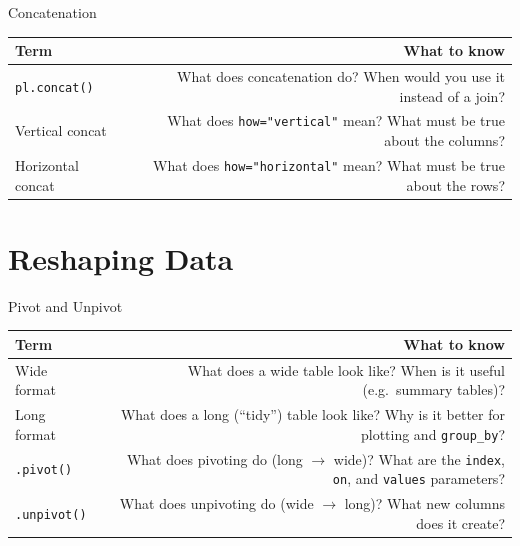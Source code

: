 \documentclass[9pt,aspectratio=169]{beamer}
\begin{document}
\begin{frame}{Concatenation}

\begin{tabular}{@{}lR@{}}
\toprule
\textbf{Term} & \textbf{What to know} \\
\midrule
\alert{\texttt{pl.concat()}} & What does concatenation do? When would you use it instead of a join? \\[0.8em]
\alert{Vertical concat} & What does \texttt{how="vertical"} mean? What must be true about the columns? \\[0.8em]
\alert{Horizontal concat} & What does \texttt{how="horizontal"} mean? What must be true about the rows? \\
\bottomrule
\end{tabular}

\end{frame}


\section{Reshaping Data}

\begin{frame}{Pivot and Unpivot}

\begin{tabular}{@{}lR@{}}
\toprule
\textbf{Term} & \textbf{What to know} \\
\midrule
\alert{Wide format} & What does a wide table look like? When is it useful (e.g.\ summary tables)? \\[0.8em]
\alert{Long format} & What does a long (``tidy'') table look like? Why is it better for plotting and \texttt{group\_by}? \\[0.8em]
\alert{\texttt{.pivot()}} & What does pivoting do (long $\to$ wide)? What are the \texttt{index}, \texttt{on}, and \texttt{values} parameters? \\[0.8em]
\alert{\texttt{.unpivot()}} & What does unpivoting do (wide $\to$ long)? What new columns does it create? \\
\bottomrule
\end{tabular}

\end{frame}


\end{document}
